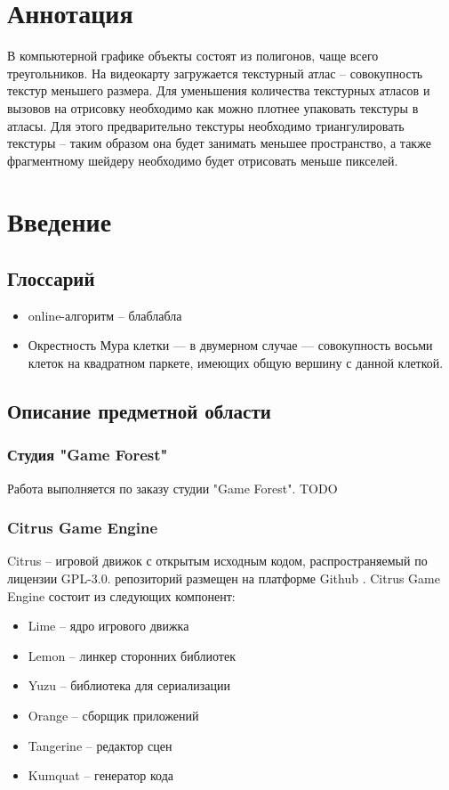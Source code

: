 \documentclass{fefu}
\author{Терехов Д.Е.}
\begin{document}
\makereporttitle
\tableofcontents
\pagebreak
\section*{Аннотация}
В компьютерной графике объекты состоят из полигонов, чаще всего треугольников.
На видеокарту загружается текстурный атлас -- совокупность текстур меньшего размера.
Для уменьшения количества текстурных атласов и вызовов на отрисовку необходимо как можно плотнее упаковать
текстуры в атласы. Для этого предварительно текстуры необходимо триангулировать текстуры -- таким образом
 она будет занимать меньшее пространство, а также фрагментному шейдеру необходимо будет отрисовать меньше пикселей.
\newpage
 \section{Введение}
\subsection{Глоссарий}
\begin{itemize}
    \item online-алгоритм -- блаблабла
    \item Окрестность Мура клетки — в двумерном случае — совокупность восьми клеток на квадратном паркете,
    имеющих общую вершину с данной клеткой.
\end{itemize}
\subsection{Описание предметной области}
\subsubsection{Студия "Game Forest"}
Работа выполняется по заказу студии "Game Forest". TODO
\subsubsection{Citrus Game Engine}
Citrus -- игровой движок с открытым исходным кодом, распространяемый по лицензии GPL-3.0.
репозиторий размещен на платформе Github \cite{CitrusRepo}. Citrus Game Engine
состоит из следующих компонент:
\begin{itemize}
    \item Lime -- ядро игрового движка
    \item Lemon -- линкер сторонних библиотек
    \item Yuzu -- библиотека для сериализации
    \item Orange -- сборщик приложений
    \item Tangerine -- редактор сцен
    \item Kumquat -- генератор кода
\end{itemize}
\end{document}
